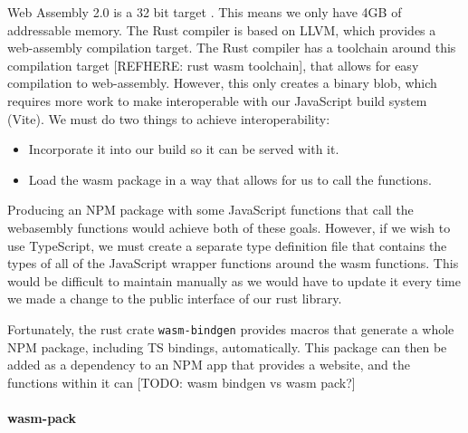 Web Assembly 2.0 is a 32 bit target \cite{WebAssemblyCoreSpecification2}. This means we only have 4GB of addressable memory. The Rust compiler is based on LLVM, which provides a web-assembly compilation target. The Rust compiler has a toolchain around this compilation target [REFHERE: rust wasm toolchain], that allows for easy compilation to web-assembly. However, this only creates a binary blob, which requires more work to make interoperable with our JavaScript build system (Vite). We must do two things to achieve interoperability:
\begin{itemize}
    \item Incorporate it into our build so it can be served with it.
    \item Load the wasm package in a way that allows for us to call the functions.
\end{itemize}
Producing an NPM package with some JavaScript functions that call the webasembly functions would achieve both of these goals. However, if we wish to use TypeScript, we must create a separate type definition file that contains the types of all of the JavaScript wrapper functions around the wasm functions. This would be difficult to maintain manually as we would have to update it every time we made a change to the public interface of our rust library. 

Fortunately, the rust crate \verb|wasm-bindgen| provides macros that generate a whole NPM package, including TS bindings, automatically. This package can then be added as a dependency to an NPM app that provides a website, and the functions within it can [TODO: wasm bindgen vs wasm pack?]

\paragraph{wasm-pack}
\label{bg:wasm-pack}